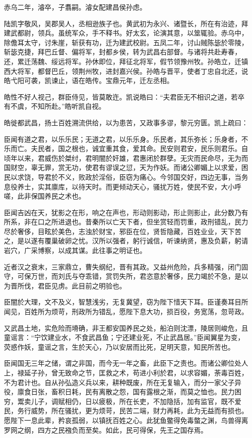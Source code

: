 \documentclass[12pt,UTF8]{ctexbook}
\begin{document}
赤乌二年，濬卒，子翥嗣。濬女配建昌侯孙虑。

陆凯字敬风，吴郡吴人，丞相逊族子也。黄武初为永兴、诸暨长，所在有治迹，拜建武都尉，领兵。虽统军众，手不释书。好太玄，论演其意，以筮辄验。赤乌中，除儋耳太守，讨朱崖，斩获有功，迁为建武校尉。五凤二年，讨山贼陈毖於零陵，斩毖克捷，拜巴丘督、偏将军，封都乡侯，转为武昌右部督。与诸将共赴寿春，还，累迁荡魏、绥远将军。孙休即位，拜征北将军，假节领豫州牧。孙皓立，迁镇西大将军，都督巴丘，领荆州牧，进封嘉兴侯。孙皓与晋平，使者丁忠自北还，说皓弋阳可袭，凯谏止，语在皓传。宝鼎元年，迁左丞相。

皓性不好人视己，群臣侍见，皆莫敢迕。凯说皓曰：“夫君臣无不相识之道，若卒有不虞，不知所赴。”皓听凯自视。

皓徙都武昌，扬土百姓溯流供给，以为患苦，又政事多谬，黎元穷匮。凯上疏曰：

臣闻有道之君，以乐乐民；无道之君，以乐乐身。乐民者，其乐弥长；乐身者，不乐而亡。夫民者，国之根也，诚宜重其食，爱其命。民安则君安，民乐则君乐。自顷年以来，君威伤於桀纣，君明闇於奸雄，君惠闭於群孽。无灾而民命尽，无为而国财空，辜无罪，赏无功，使君有谬误之愆，天为作妖。而诸公卿媚上以求爱，困民以求饶，导君於不义，败政於淫俗，臣窃为痛心。今邻国交好，四边无事，当务息役养士，实其廪库，以待天时。而更倾动天心，骚扰万姓，使民不安，大小呼嗟，此非保国养民之术也。

臣闻吉凶在天，犹影之在形，响之在声也，形动则影动，形止则影止，此分数乃有所系，非在口之所进退也。昔秦所以亡天下者，但坐赏轻而罚重，政刑错乱，民力尽於奢侈，目眩於美色，志浊於财宝，邪臣在位，贤哲隐藏，百姓业业，天下苦之，是以遂有覆巢破卵之忧。汉所以强者，躬行诚信，听谏纳贤，惠及负薪，躬请岩穴，广采博察，以成其谋。此往事之明证也。

近者汉之衰末，三家鼎立，曹失纲纪，晋有其政。又益州危险，兵多精强，闭门固守，可保万世，而刘氏与夺乖错，赏罚失所，君恣意於奢侈，民力竭於不急，是以为晋所伐，君臣见虏。此目前之明验也。

臣闇於大理，文不及义，智慧浅劣，无复冀望，窃为陛下惜天下耳。臣谨奏耳目所闻见，百姓所为烦苛，刑政所为错乱，愿陛下息大功，损百役，务宽荡，忽苛政。

又武昌土地，实危险而塉确，非王都安国养民之处，船泊则沈漂，陵居则峻危，且童谣言：“宁饮建业水，不食武昌鱼；宁还建业死，不止武昌居。”臣闻翼星为变，荧惑作妖，童谣之言，生於天心，乃以安居而比死，足明天意，知民所苦也。

臣闻国无三年之储，谓之非国，而今无一年之畜，此臣下之责也。而诸公卿位处人上，禄延子孙，曾无致命之节，匡救之术，苟进小利於君，以求容媚，荼毒百姓，不为君计也。自从孙弘造义兵以来，耕种既废，所在无复输入，而分一家父子异役，廪食日张，畜积日耗，民有离散之怨，国有露根之渐，而莫之恤也。民力困穷，鬻卖儿子，调赋相仍，日以疲极，所在长吏，不加隐括，加有监官，既不爱民，务行威势，所在骚扰，更为烦苛，民苦二端，财力再耗，此为无益而有损也。愿陛下一息此辈，矜哀孤弱，以镇抚百姓之心。此犹鱼鳖得免毒螫之渊，鸟兽得离罗网之纲，四方之民襁负而至矣。如此，民可得保，先王之国存焉。
\end{document}
